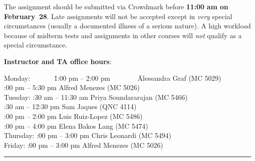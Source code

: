 \documentclass[11pt]{article}
\begin{document}
\vspace*{2mm}
\noindent
The assignment should be submitted via Crowdmark before {\bf 11:00 am
on February~28}. Late assignments will not be accepted except in
\emph{very} special circumstances (usually a documented illness of
a serious nature). A high workload because of midterm tests and assignments
in other courses will \emph{not} qualify as a special circumstance.

\vspace*{4mm}
\noindent
{\bf Instructor and TA office hours}:
\begin{tabbing}
Monday:~~~~~~~\=1:00 pm -- 2:00 pm~~~~~~~~\= Alessandra Graf (MC 5029)\\
:00 pm -- 5:30 pm \> Alfred Menezes (MC 5026)\\
Tuesday: :30 am -- 11:30 am \> Priya Soundararajan (MC 5466)\\
:30 am -- 12:30 pm \> Sam Jaques (QNC 4114)\\
:00 pm -- 2:00 pm \> Luis Ruiz-Lopez (MC 5486)\\
:00 pm -- 4:00 pm \> Elena Bakos Lang (MC 5474)\\
Thursday: :00 pm -- 3:00 pm \> Chris Leonardi (MC 5494)\\
Friday: :00 pm -- 3:00 pm \> Alfred Menezes (MC 5026)
\end{tabbing}

\hfill\hrule
\end{document}
